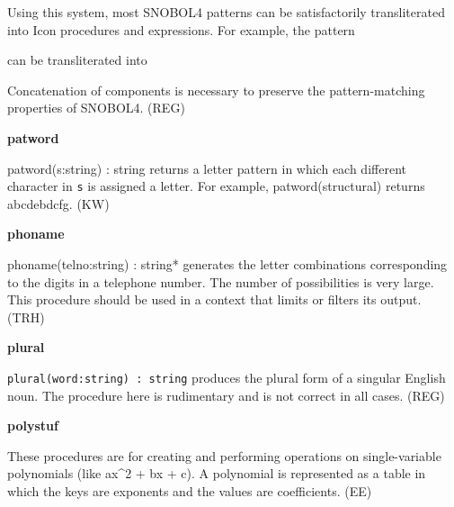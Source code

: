 Using this system, most SNOBOL4 patterns can be satisfactorily
transliterated into Icon procedures and expressions. For example, the
pattern


can be transliterated into


Concatenation of components is necessary to preserve the
pattern-matching properties of SNOBOL4. (REG)

{\sffamily\bfseries
patword}

\textsf{patword(s:string) : string} returns a letter pattern in which
each different character in \texttt{s} is assigned a letter. For
example, \textsf{patword({\textquotedbl}structural{\textquotedbl})}
returns \textsf{{\textquotedbl}abcdebdcfg{\textquotedbl}}. (KW)

{\sffamily\bfseries
phoname}

\textsf{phoname(telno:string) : string*} generates the letter
combinations corresponding to the digits in a telephone number. The
number of possibilities is very large. This procedure should be used in
a context that limits or filters its output. (TRH)

{\sffamily\bfseries
plural}

\texttt{plural(word:string) : string} produces the plural form of a singular English noun. The procedure here is
rudimentary and is not correct in all cases. (REG)

{\sffamily\bfseries
polystuf}

These procedures are for creating and performing operations on
single-variable polynomials (like ax\^{}2 + bx + c).
A polynomial is represented as a table in which the keys are exponents
and the values are coefficients. (EE)

